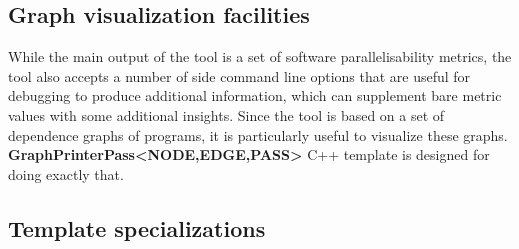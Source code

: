 \subsection{Graph visualization facilities} \label{ppar-tool-graph-visualizations}
\qquad While the main output of the tool is a set of software parallelisability metrics, the tool also accepts a number of side command line options that are useful for debugging to produce additional information, which can supplement bare metric values with some additional insights. Since the tool is based on a set of dependence graphs of programs, it is particularly useful to visualize these graphs. \newline
\null\qquad \textbf{GraphPrinterPass\textless NODE,EDGE,PASS\textgreater} C++ template is designed for doing exactly that.



\subsection{Template specializations} \label{ppar-tool-template-specs}


